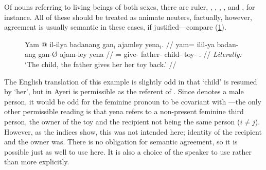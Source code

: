 Of nouns referring to living beings of both sexes, there are 
{ruler}, , ,
, , and
, for instance. All of these should be treated as
animate neuters, factually, however, agreement is usually semantic in these
cases, if justified---compare (\ref{ex:childsem}).

\begin{figure}[h]
\ex\label{ex:childsem}\begingl
	\gla Yam @ il-ilya badanang gan$_i$ ajamley yena$_i$. //
	\glb yam= il\til{}il-ya badan-ang gan-Ø ajam-ley yena //
	\glc \DatT{}= \Iter{}\til{}give-\TsgM{} father-\Aarg{} child-\Top{}
		toy-\PargI{} \TsgF{}.\Gen{} //
	\glft \textit{Literally:} `The child, the father gives her her toy 
		back.' //
\endgl\xe
\end{figure}

The English translation of this example is slightly odd in that `child' is
resumed by `her', but in Ayeri  is permissible as the
referent of . Since  denotes a
male person, it would be odd for the feminine pronoun to be covariant with
---the only other permissible reading is that 
{yena} refers to a non-present feminine third person, the owner of the toy and
the recipient not being the same person ($i \neq j$). However, as the indices
show, this was not intended here; identity of the recipient and the owner was.
There is no obligation for semantic agreement, so it is possible just as well
to use  here. It is also a choice of the speaker to use
 rather than  more explicitly.



